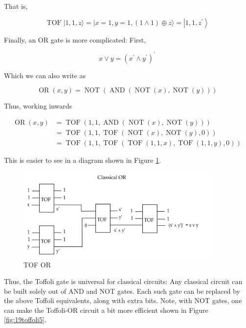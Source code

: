 \documentclass[main.tex]{subfiles}
\begin{document}
    That is,
    
    $$
    \operatorname{TOF}|1,1, z\rangle=|x=1, y=1,(1 \wedge 1) \oplus z\rangle=\left|1,1, z^{\prime}\right\rangle
    $$
    
    Finally, an OR gate is more complicated: First,
    
    $$
    x \vee y=\left(x^{\prime} \wedge y^{\prime}\right)^{\prime}
    $$
    
    Which we can also write as
    
    $$
    \operatorname{OR}(x, y)=\operatorname{NOT}(\operatorname{AND}(\operatorname{NOT}(x), \operatorname{NOT}(y)))
    $$
    
    Thus, working inwards
    
    $$
    \begin{aligned}
    \operatorname{OR}(x, y) &=\operatorname{TOF}(1,1, \operatorname{AND}(\operatorname{NOT}(x), \operatorname{NOT}(y))) \\
    &=\operatorname{TOF}(1,1, \operatorname{TOF}(\operatorname{NOT}(x), \operatorname{NOT}(y), 0)) \\
    &=\operatorname{TOF}(1,1, \operatorname{TOF}(\operatorname{TOF}(1,1, x), \operatorname{TOF}(1,1, y), 0))
    \end{aligned}
    $$
    
    This is easier to see in a diagram shown in Figure \ref{fig:18toffoli4}.
    
    \begin{figure}
        \centering
        \includegraphics[width=4in]{notes/figs/n10/18toffoli4.png}
        \caption{TOF OR}
        \label{fig:18toffoli4}
    \end{figure}
    
    Thus, the Toffoli gate is universal for classical circuits: Any classical circuit can be built solely out of AND and NOT gates. Each such gate can be replaced by the above Toffoli equivalents, along with extra bits. Note, with NOT gates, one can make the Toffoli-OR circuit a bit more efficient shown in Figure \ref{fig:19toffoli5}.
    
\end{document}
